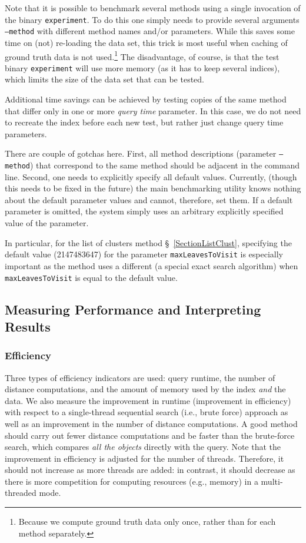 \documentclass[runningheads,a4paper]{llncs}
\newcommand{\ttt}[1]{\texttt{#1}}
\begin{document}
{Note that it is possible to benchmark several methods
using a single invocation of the binary \ttt{experiment}. 
To do this one simply needs to provide several arguments \ttt{--method} with different method
names and/or parameters.
While this saves some time on (not) re-loading the data set,
this trick is most useful when caching of ground truth data is not used.\footnote{Because
we compute ground truth data only once, rather than for each method separately.}
The disadvantage, of course, is that the test binary \ttt{experiment} will use
more memory (as it has to keep several indices), which limits the size of the data set that can be tested. 

Additional time savings can be achieved by testing copies of the same method
that differ only in one or more \emph{query time} parameter.
In this case, we do not need to recreate the index before each new test,
but rather just change query time parameters.

There are couple of gotchas here. 
First, all method descriptions (parameter \ttt{--method}) that correspond
to the same method should be adjacent in the command line. 
Second, one needs to explicitly specify all default values.
Currently, (though this needs to be fixed in the future)
the main benchmarking utility knows nothing about the default parameter
values and cannot, therefore, set them. If a default parameter is omitted,
the system simply uses an arbitrary explicitly specified value of the parameter.

In particular, for the list of clusters method \S~\ref{SectionListClust},
specifying the default value (2147483647) for the parameter \ttt{maxLeavesToVisit} is
 especially important as the method uses a different (a special exact search
algorithm) when \ttt{maxLeavesToVisit} is equal to the default value.

\subsection{Measuring Performance and Interpreting Results}\label{SectionMeasurePerf}
\subsubsection{Efficiency}
Three types of efficiency indicators are used: query runtime, the number of distance computations,
and the amount of memory used by the index \emph{and} the data.
We also measure the improvement in runtime (improvement in efficiency) 
with respect to a single-thread sequential search (i.e., brute force) approach
as well as an improvement in the number of distance computations. 
A good method should
carry out fewer distance computations and be faster than the brute-force search,
which compares \emph{all the objects} directly with the query. 
Note that the improvement in efficiency is adjusted for the number of threads.
Therefore, it should not increase as more threads are added: in contrast,
it should decrease as there is more competition for computing resources (e.g., memory)
in a multi-threaded mode.

}
\end{document}
